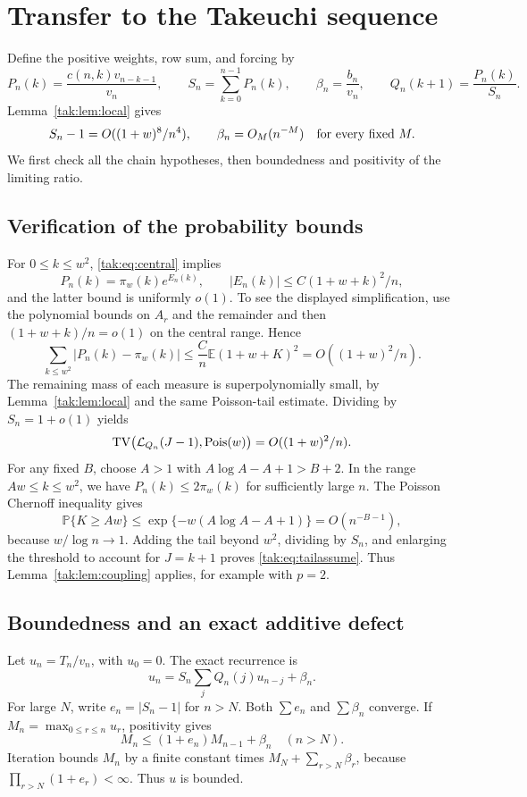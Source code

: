 \documentclass[11pt,letterpaper]{article}
\theoremstyle{remark}\newtheorem{remark}[theorem]{Remark}
\newcommand{\E}{\mathbb E}\newcommand{\Pp}{\mathbb P}
\newcommand{\TV}{\operatorname{TV}}\newcommand{\Pois}{\operatorname{Pois}}
\begin{document}
\section{Transfer to the Takeuchi sequence}\label{tak:sec:transfer}
Define the positive weights, row sum, and forcing by
\begin{equation}
 P_n(k)=\frac{c(n,k)v_{n-k-1}}{v_n},\qquad S_n=\sum_{k=0}^{n-1}P_n(k),
 \qquad\beta_n=\frac{b_n}{v_n},\qquad Q_n(k+1)=\frac{P_n(k)}{S_n}.\label{tak:eq:normalize}
\end{equation}
Lemma~\ref{tak:lem:local} gives
\begin{equation}
 S_n-1=O((1+w)^8/n^4),\qquad \beta_n=O_M(n^{-M})\quad\hbox{for every fixed }M.\label{tak:eq:rows}
\end{equation}
We first check all the chain hypotheses, then boundedness and positivity of the limiting ratio.

\subsection{Verification of the probability bounds}
For $0\leq k\leq w^2$, \eqref{tak:eq:central} implies
\[
 P_n(k)=\pi_w(k)e^{E_n(k)},\qquad
 |E_n(k)|\leq C(1+w+k)^2/n,
\]
and the latter bound is uniformly $o(1)$. To see the displayed simplification, use the polynomial bounds on $A_r$ and the remainder and then $(1+w+k)/n=o(1)$ on the central range. Hence
\[
 \sum_{k\leq w^2}|P_n(k)-\pi_w(k)|
 \leq \frac Cn\E(1+w+K)^2=O((1+w)^2/n).
\]
The remaining mass of each measure is superpolynomially small, by Lemma~\ref{tak:lem:local} and the same Poisson-tail estimate. Dividing by $S_n=1+o(1)$ yields
\begin{equation}
 \TV\bigl(\cL_{Q_n}(J-1),\Pois(w)\bigr)=O((1+w)^2/n).\label{tak:eq:tv}
\end{equation}
For any fixed $B$, choose $A>1$ with $A\log A-A+1>B+2$. In the range $Aw\leq k\leq w^2$, we have $P_n(k)\leq2\pi_w(k)$ for sufficiently large $n$. The Poisson Chernoff inequality gives
\[
 \Pp\{K\geq Aw\}\leq\exp\{-w(A\log A-A+1)\}=O(n^{-B-1}),
\]
because $w/\log n\to1$. Adding the tail beyond $w^2$, dividing by $S_n$, and enlarging the threshold to account for $J=k+1$ proves \eqref{tak:eq:tailassume}. Thus Lemma~\ref{tak:lem:coupling} applies, for example with $p=2$.

\subsection{Boundedness and an exact additive defect}
Let $u_n=T_n/v_n$, with $u_0=0$. The exact recurrence is
\begin{equation}
 u_n=S_n\sum_jQ_n(j)u_{n-j}+\beta_n.\label{tak:eq:uexact}
\end{equation}
For large $N$, write $e_n=|S_n-1|$ for $n>N$. Both $\sum e_n$ and $\sum\beta_n$ converge. If $M_n=\max_{0\leq r\leq n}u_r$, positivity gives
\[
 M_n\leq(1+e_n)M_{n-1}+\beta_n\quad(n>N).
\]
Iteration bounds $M_n$ by a finite constant times $M_N+\sum_{r>N}\beta_r$, because $\prod_{r>N}(1+e_r)<\infty$. Thus $u$ is bounded.
\end{document}
